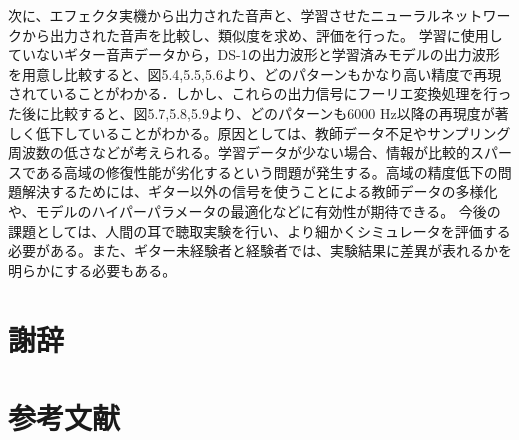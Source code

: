 \documentclass{jreport}		%
\begin{document}
次に、エフェクタ実機から出力された音声と、学習させたニューラルネットワークから出力された音声を比較し、類似度を求め、評価を行った。
学習に使用していないギター音声データから，DS-1の出力波形と学習済みモデルの出力波形を用意し比較すると、図5.4,5.5,5.6より、どのパターンもかなり高い精度で再現されていることがわかる．しかし、これらの出力信号にフーリエ変換処理を行った後に比較すると、図5.7,5.8,5.9より、どのパターンも6000 Hz以降の再現度が著しく低下していることがわかる。原因としては、教師データ不足やサンプリング周波数の低さなどが考えられる。学習データが少ない場合、情報が比較的スパースである高域の修復性能が劣化するという問題が発生する。高域の精度低下の問題解決するためには、ギター以外の信号を使うことによる教師データの多様化や、モデルのハイパーパラメータの最適化などに有効性が期待できる。
今後の課題としては、人間の耳で聴取実験を行い、より細かくシミュレータを評価する必要がある。また、ギター未経験者と経験者では、実験結果に差異が表れるかを明らかにする必要もある。

\chapter*{謝辞}

\chapter*{参考文献}
\end{document}

